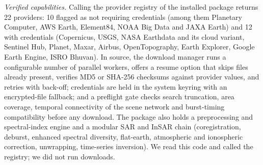 \documentclass[conference]{IEEEtran}
\begin{document}
\textit{Verified capabilities.} Calling the provider registry of the installed package returns 22 providers: 10 flagged as not requiring credentials (among them Planetary Computer, AWS Earth, Element84, NOAA Big Data and JAXA Earth) and 12 with credentials (Copernicus, USGS, NASA Earthdata and its cloud variant, Sentinel Hub, Planet, Maxar, Airbus, OpenTopography, Earth Explorer, Google Earth Engine, ISRO Bhuvan). In source, the download manager runs a configurable number of parallel workers, offers a resume option that skips files already present, verifies MD5 or SHA-256 checksums against provider values, and retries with back-off; credentials are held in the system keyring with an encrypted-file fallback; and a preflight gate checks search truncation, area coverage, temporal connectivity of the scene network and burst-timing compatibility before any download. The package also holds a preprocessing and spectral-index engine and a modular SAR and InSAR chain (coregistration, deburst, enhanced spectral diversity, flat-earth, atmospheric and ionospheric correction, unwrapping, time-series inversion). We read this code and called the registry; we did not run downloads.
\end{document}
